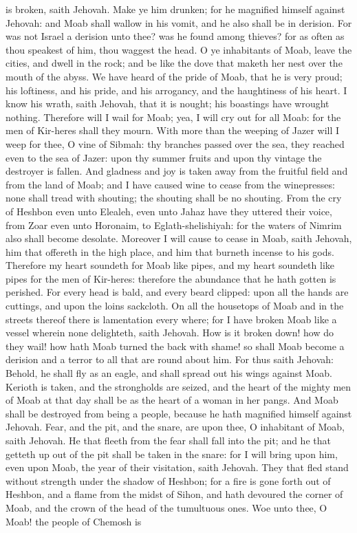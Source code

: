 is broken, saith Jehovah.  Make ye him drunken; for he magnified himself against Jehovah: and Moab shall wallow in his vomit, and he also shall be in derision. For was not Israel a derision unto thee? was he found among thieves? for as often as thou speakest of him, thou waggest the head. O ye inhabitants of Moab, leave the cities, and dwell in the rock; and be like the dove that maketh her nest over the mouth of the abyss. We have heard of the pride of Moab, that he is very proud; his loftiness, and his pride, and his arrogancy, and the haughtiness of his heart. I know his wrath, saith Jehovah, that it is nought; his boastings have wrought nothing. Therefore will I wail for Moab; yea, I will cry out for all Moab: for the men of Kir-heres shall they mourn. With more than the weeping of Jazer will I weep for thee, O vine of Sibmah: thy branches passed over the sea, they reached even to the sea of Jazer: upon thy summer fruits and upon thy vintage the destroyer is fallen. And gladness and joy is taken away from the fruitful field and from the land of Moab; and I have caused wine to cease from the winepresses: none shall tread with shouting; the shouting shall be no shouting. From the cry of Heshbon even unto Elealeh, even unto Jahaz have they uttered their voice, from Zoar even unto Horonaim, to Eglath-shelishiyah: for the waters of Nimrim also shall become desolate. Moreover I will cause to cease in Moab, saith Jehovah, him that offereth in the high place, and him that burneth incense to his gods.  Therefore my heart soundeth for Moab like pipes, and my heart soundeth like pipes for the men of Kir-heres: therefore the abundance that he hath gotten is perished. For every head is bald, and every beard clipped: upon all the hands are cuttings, and upon the loins sackcloth. On all the housetops of Moab and in the streets thereof there is lamentation every where; for I have broken Moab like a vessel wherein none delighteth, saith Jehovah. How is it broken down! how do they wail! how hath Moab turned the back with shame! so shall Moab become a derision and a terror to all that are round about him. For thus saith Jehovah: Behold, he shall fly as an eagle, and shall spread out his wings against Moab. Kerioth is taken, and the strongholds are seized, and the heart of the mighty men of Moab at that day shall be as the heart of a woman in her pangs. And Moab shall be destroyed from being a people, because he hath magnified himself against Jehovah. Fear, and the pit, and the snare, are upon thee, O inhabitant of Moab, saith Jehovah. He that fleeth from the fear shall fall into the pit; and he that getteth up out of the pit shall be taken in the snare: for I will bring upon him, even upon Moab, the year of their visitation, saith Jehovah.  They that fled stand without strength under the shadow of Heshbon; for a fire is gone forth out of Heshbon, and a flame from the midst of Sihon, and hath devoured the corner of Moab, and the crown of the head of the tumultuous ones. Woe unto thee, O Moab! the people of Chemosh is 